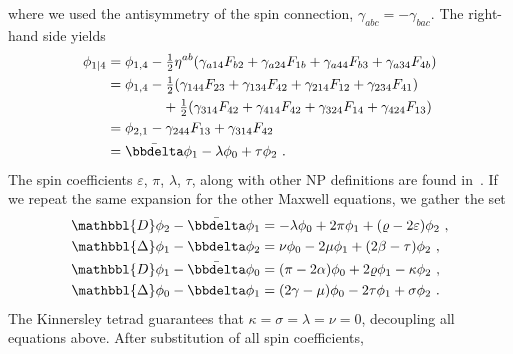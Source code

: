 where we used the antisymmetry of the spin connection, $\gamma_{abc}=-\gamma_{bac}$. The right-hand side yields
\begin{align}
    \begin{split}
        \phi_{1\rvert 4} &= \phi_{1, 4} - \tfrac{1}{2} \eta^{ab}( \gamma_{a14} F_{b2} + \gamma_{a24} F_{1b} + \gamma_{a44} F_{b3} + \gamma_{a34} F_{4b} ) \\
        &= \phi_{1, 4} - \tfrac{1}{2} ( \gamma_{144} F_{23} + \gamma_{134} F_{42} + \gamma_{214} F_{12} + \gamma_{234} F_{41} ) \\ 
        &\qquad\qquad + \tfrac{1}{2} ( \gamma_{314} F_{42} + \gamma_{414} F_{42} + \gamma_{324} F_{14} + \gamma_{424} F_{13} ) \\
        &= \phi_{2, 1} - \gamma_{244} F_{13} + \gamma_{314} F_{42} \\
        &= \bar{\bbdelta} \phi_1 - \lambda \phi_0 + \tau \phi_2  ~.
    \end{split}
    \label{eq3:phi21SpinCoef}
\end{align}
The spin coefficients $\varepsilon$, $\pi$, $\lambda$, $\tau$, along with other NP definitions are found in~. If we repeat the same expansion for the other Maxwell equations, we gather the set
\begin{subequations}
    \begin{align}
        \label{eq3:phi21phi14SpinCoef}
        \mathbbl{D} \phi_2 - \bar{\bbdelta} \phi_1 &= -\lambda \phi_0 + 2 \pi \phi_1 + (\varrho - 2 \varepsilon) \phi_2 ~,\\
        \label{eq3:phi12phi23SpinCoef}
        \mathbbl{\Delta} \phi_1 - \bbdelta \phi_2 &= \nu \phi_0 - 2 \mu \phi_1 + (2\beta-\tau) \phi_2 ~,\\
        \label{eq3:phi11phi04SpinCoef}
        \mathbbl{D} \phi_1 - \bar{\bbdelta} \phi_0 &= (\pi - 2 \alpha) \phi_0 + 2 \varrho \phi_1 - \kappa \phi_2 ~,\\
        \label{eq3:phi02phi13SpinCoef}
        \mathbbl{\Delta} \phi_0 - \bbdelta \phi_1 &= (2 \gamma - \mu) \phi_0 - 2 \tau \phi_1 + \sigma \phi_2 ~.
    \end{align}
\end{subequations}
The Kinnersley tetrad guarantees that $\kappa = \sigma = \lambda = \nu = 0$, decoupling all equations above. After substitution of all spin coefficients,
